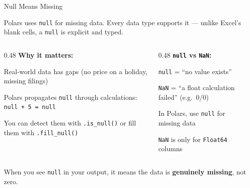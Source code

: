 \documentclass[9pt,aspectratio=169]{beamer}
\newcommand{\py}[1]{\lstinline[language=Python]{#1}}
\begin{document}
\begin{frame}[fragile]{Null Means Missing}

Polars uses \py{null} for missing data. Every data type supports it --- unlike Excel's blank cells, a \py{null} is explicit and typed.

\bigskip

\begin{columns}[T]
\begin{column}{0.48\textwidth}
\textbf{Why it matters:}
\bi
    \item Real-world data has gaps (no price on a holiday, missing filings)
    \item Polars propagates \py{null} through calculations: \texttt{null + 5 = null}
    \item You can detect them with \py{.is_null()} or fill them with \py{.fill_null()}
\ei
\end{column}
\begin{column}{0.48\textwidth}
\textbf{\texttt{null} vs \texttt{NaN}:}
\bi
    \item \texttt{null} = ``no value exists''
    \item \texttt{NaN} = ``a float calculation failed'' (e.g.\ 0/0)
    \item In Polars, use \py{null} for missing data
    \item \texttt{NaN} is only for \texttt{Float64} columns
\ei
\end{column}
\end{columns}

\bigskip

\begin{highlightbox}
\centering
When you see \texttt{null} in your output, it means the data is \textbf{genuinely missing}, not zero.
\end{highlightbox}

\end{frame}
\end{document}
